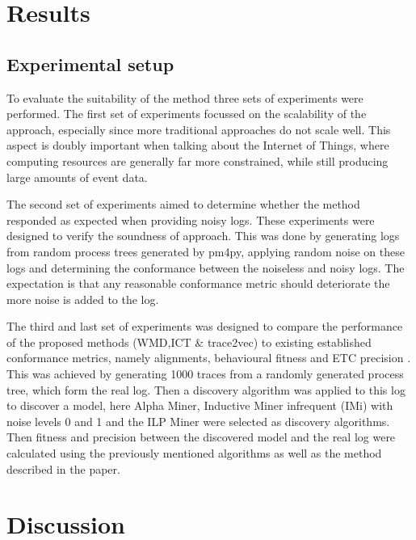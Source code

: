 \documentclass[runningheads]{template/llncs}
\begin{document}
\section{Results}

\subsection{Experimental setup}

To evaluate the suitability of the method three sets of experiments were performed. 
The first set of experiments focussed on the scalability of the approach, especially since more traditional approaches do not scale well. This aspect is doubly important when talking about the Internet of Things, where computing resources are generally far more constrained, while still producing large amounts of event data.

The second set of experiments aimed to determine whether the method responded as expected when providing noisy logs.
These experiments were designed to verify the soundness of approach.
This was done by generating logs from random process trees generated by pm4py, applying random noise on these logs and determining the conformance between the noiseless and noisy logs.
The expectation is that any reasonable conformance metric should deteriorate the more noise is added to the log.

The third and last set of experiments was designed to compare the performance of the proposed methods (WMD,ICT \& trace2vec) to existing established conformance metrics, namely alignments, behavioural fitness \cite{GMVB09} and ETC precision \cite{MuCa10}.
This was achieved by generating 1000 traces from a randomly generated process tree, which form the real log.
Then a discovery algorithm was applied to this log to discover a model, here Alpha Miner, Inductive Miner infrequent (IMi) with noise levels 0 and 1 and the ILP Miner were selected as discovery algorithms.
Then fitness and precision between the discovered model and the real log were calculated using the previously mentioned algorithms as well as the method described in the paper.

\section{Discussion}
\end{document}
